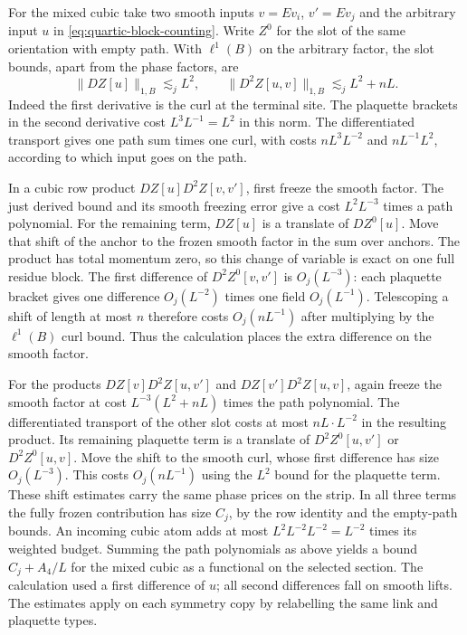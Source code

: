 \documentclass[11pt,reqno]{amsart}
\numberwithin{equation}{section}
\theoremstyle{definition}
\theoremstyle{remark}
\begin{document}
For the mixed cubic take two smooth inputs \(v=Ev_i\),
\(v'=Ev_j\) and the arbitrary input \(u\) in
\eqref{eq:quartic-block-counting}. Write \(Z^0\) for the slot
of the same orientation with empty path. With \(\ell^1(B)\)
on the arbitrary factor, the slot bounds, apart from the
phase factors, are
\[
 \|DZ[u]\|_{1,B}\lesssim_j L^2,\qquad
 \|D^2Z[u,v]\|_{1,B}\lesssim_j L^2+nL .
\]
Indeed the first derivative is the curl at the terminal
site. The plaquette brackets in the second derivative cost
\(L^3L^{-1}=L^2\) in this norm. The differentiated transport
gives one path sum times one curl, with costs
\(nL^3L^{-2}\) and \(nL^{-1}L^2\), according to
which input goes on the path.

In a cubic row product \(DZ[u]D^2Z[v,v']\), first freeze
the smooth factor. The just derived bound and its smooth
freezing error give a cost \(L^2L^{-3}\) times a path polynomial.
For the remaining term, \(DZ[u]\) is a translate of \(DZ^0[u]\).
Move that shift of the anchor to the frozen smooth factor in
the sum over anchors. The product has total momentum zero,
so this change of variable is exact on one full residue block.
The first difference of \(D^2Z^0[v,v']\) is \(O_j(L^{-3})\):
each plaquette bracket gives one difference \(O_j(L^{-2})\)
times one field \(O_j(L^{-1})\). Telescoping a shift of
length at most \(n\) therefore costs \(O_j(nL^{-1})\)
after multiplying by the \(\ell^1(B)\) curl bound.
Thus the calculation places the extra difference on the
smooth factor.

For the products \(DZ[v]D^2Z[u,v']\) and
\(DZ[v']D^2Z[u,v]\), again freeze the smooth factor at
cost \(L^{-3}(L^2+nL)\) times the path polynomial.
The differentiated transport of the other slot costs at most
\(nL\cdot L^{-2}\) in the resulting product. Its remaining
plaquette term is a translate of \(D^2Z^0[u,v']\) or
\(D^2Z^0[u,v]\). Move the shift to the smooth curl, whose first
difference has size \(O_j(L^{-3})\). This costs \(O_j(nL^{-1})\)
using the \(L^2\) bound for the plaquette term. These shift
estimates carry the same phase prices on the strip. In all
three terms the fully frozen contribution has size \(C_j\),
by the row identity and the empty-path bounds. An incoming
cubic atom adds at most \(L^2 L^{-2}L^{-2}=L^{-2}\) times its
weighted budget. Summing the path polynomials as above yields
a bound \(C_j+A_4/L\) for the mixed cubic as a functional on
the selected section. The calculation used a first difference
of \(u\); all second differences fall on smooth lifts.
The estimates apply on each symmetry copy by relabelling
the same link and plaquette types.
\end{document}
